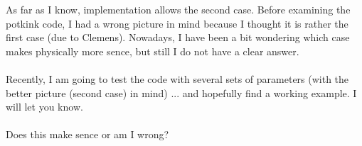 \documentclass{article}
\numberwithin{equation}{section}
\newcommand{\us}[1]{\underset{\textrm{s}}{#1}{}}
\begin{document}
As far as I know, implementation allows the second case. Before examining the potkink code, I had a wrong picture in mind because I thought it is rather the first case (due to Clemens). Nowadays, I have been a bit wondering which case makes physically more sence, but still I do not have a clear answer.
\\
\\
Recently, I am going to test the code with several sets of parameters (with the better picture (second case) in mind) ... and hopefully find a working example. I will let you know.
\\
\\
Does this make sence or am I wrong?
\\
\\
\end{document}
